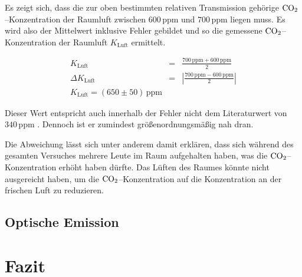 \documentclass[12pt,a4paper]{scrartcl}
\numberwithin{equation}{section} %
\begin{document}
Es zeigt sich, dass  die zur oben bestimmten relativen Transmission gehörige $\ce{CO_2}$--Konzentration der Raumluft zwischen $600 \mathrm{\, ppm}$ und $700 \mathrm{\, ppm}$ liegen muss. Es wird also der Mittelwert inklusive Fehler gebildet und so die gemessene $\ce{CO_2}$--Konzentration der Raumluft $K_\mathrm{Luft}$ ermittelt.

\begin{eqnarray}
	K_\mathrm{Luft} &=& \frac{700 \mathrm{\, ppm} + 600 \mathrm{\, ppm}}{2} \\
	\Delta K_\mathrm{Luft} &=& \left|\frac{700 \mathrm{\, ppm} - 600 \mathrm{\, ppm}}{2}\right| \\
	K_\mathrm{Luft} = (650 \pm 50) \mathrm{\, ppm}
\end{eqnarray}

Dieser Wert entspricht auch innerhalb der Fehler nicht dem Literaturwert von $340 \mathrm{\, ppm}$ \cite{Demtröder Kern/Atom}. Dennoch ist er zumindest größenordnungsmäßig nah dran.

Die Abweichung lässt sich unter anderem damit erklären, dass sich während des gesamten Versuches mehrere Leute im Raum aufgehalten haben, was die $\ce{CO_2}$--Konzentration erhöht haben dürfte. Das Lüften des Raumes könnte nicht ausgereicht haben, um die $\ce{CO_2}$--Konzentration auf die Konzentration an der frischen Luft zu reduzieren.

\subsection{Optische Emission}
\label{Optische Emission}

\clearpage
\hypertarget{fazit}{%
\section{Fazit}\label{fazit}}
\end{document}
